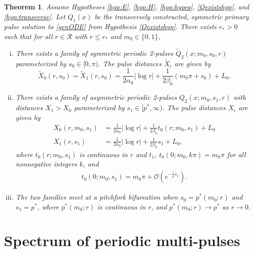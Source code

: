 \documentclass[10pt,reqno]{amsart}
\theoremstyle{plain}
\newtheorem{theorem}{Theorem}
\theoremstyle{definition}
\theoremstyle{remark}
\numberwithin{theorem}{section}
\numberwithin{equation}{section}
\begin{document}
\begin{theorem}\label{2pulsebifurcation}
Assume Hypotheses \ref{hyp:E}, \ref{hyp:H}, \ref{hyp:hypeq}, \ref{Qexistshyp}, and \ref{hyp:transverse}. Let $Q_1(x)$ be the transversely constructed, symmetric primary pulse solution to \eqref{genODE} from Hypothesis \ref{Qexistshyp}. There exists $r_* > 0$ such that for all $r \in \mathcal{R}$ with $r \leq r_*$ and $m_0 \in \{0, 1\}$,
\begin{enumerate}[(i)]
	\item There exists a family of symmetric periodic 2-pulses $\tilde{Q}_2(x; m_0, s_0, r)$ parameterized by $s_0 \in [0, \pi)$. The pulse distances $\tilde{X}_i$ are given by
	\begin{equation}\label{2psymmdist}
		\tilde{X}_0(r, s_0) = \tilde{X}_1(r, s_0) = \frac{1}{2 \alpha_0} |\log r| + \frac{1}{2\beta_0} (m_0 \pi + s_0) + L_0.
	\end{equation}
	\item There exists a family of asymmetric periodic 2-pulses $Q_2(x; m_0, s_1, r)$ with distances $X_1 > X_0$ parameterized by $s_1 \in [p^*, \infty)$. The pulse distances $X_i$ are given by
	\begin{equation}\label{2pasymmdist}
	\begin{aligned}
		X_0(r, m_0, s_1) &= \frac{1}{2 \alpha_0} |\log r| + \frac{1}{2\beta_0} t_0(r; m_0, s_1) + L_0 \\
		X_1(r, s_1) &= \frac{1}{2 \alpha_0} |\log r| + \frac{1}{2\beta_0} s_1 + L_0, 
	\end{aligned}
	\end{equation}
	where $t_0(r; m_0, s_1)$ is continuous in $r$ and $t_1$, $t_0(0; m_0, k \pi) = m_0 \pi$ for all nonnegative integers $k$, and 
	\begin{align}\label{t0est}
	t_0(0; m_0, s_1) = m_0 \pi + \mathcal{O}\left(e^{-\frac{1}{\rho} s_1 }\right).
	\end{align}

	\item The two families meet at a pitchfork bifurcation when $s_0 = p^*(m_0; r)$ and $s_1 = p^*$, where $p^*(m_0; r)$ is continuous in $r$, and $p^*(m_0; r) \rightarrow p^*$ as $r \rightarrow 0$.
\end{enumerate}
\end{theorem}

\section{Spectrum of periodic multi-pulses}\label{sec:perstab}
\end{document}
